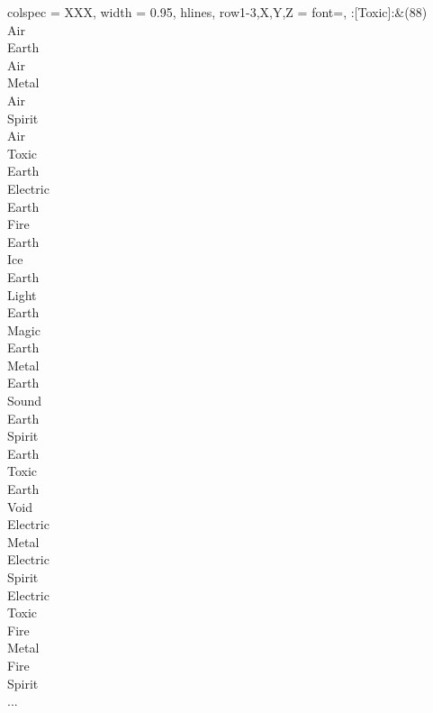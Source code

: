 \twocolumn
\begin{longtblr}[
	caption = {2v1 Defending Resisted},
	label = {2v1-Defending-Resisted},
]{
	colspec = {XXX}, width = 0.95\linewidth,
	hlines,
	row{1-3,X,Y,Z} = {font=\bfseries},
}
	:[Toxic]:&{(88)\\
	Air \\
	Earth \\
	Air \\
	Metal \\
	Air \\
	Spirit \\
	Air \\
	Toxic \\
	Earth \\
	Electric \\
	Earth \\
	Fire \\
	Earth \\
	Ice \\
	Earth \\
	Light \\
	Earth \\
	Magic \\
	Earth \\
	Metal \\
	Earth \\
	Sound \\
	Earth \\
	Spirit \\
	Earth \\
	Toxic \\
	Earth \\
	Void \\
	Electric \\
	Metal \\
	Electric \\
	Spirit \\
	Electric \\
	Toxic \\
	Fire \\
	Metal \\
	Fire \\
	Spirit \\
	...\\
	}\\


\end{longtblr}

